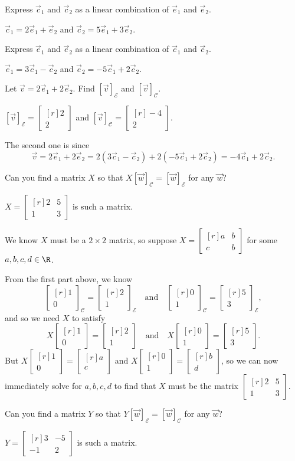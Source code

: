 \documentclass{problemset}
\newcommand{\xhat}{{\vec e_1}}
\newcommand{\yhat}{{\vec e_2}}
\newcommand{\mat}[1]{\begin{bmatrix*}[r]#1\end{bmatrix*}}
\begin{document}
	\begin{parts}
		\item Express $\vec c_1$ and $\vec c_2$ as a linear combination of $\xhat$ and $\yhat$.
			\begin{solution}[inline]
				$\vec c_1=2\xhat+\yhat$ and $\vec c_2=5\xhat+3\yhat$.
			\end{solution}
		\item Express $\xhat$ and $\yhat$ as a linear combination of $\vec c_1$ and $\vec c_2$.
			\begin{solution}[inline]
				$\xhat=3\vec c_1-\vec c_2$ and $\yhat=-5\vec c_1+2\vec c_2$.
			\end{solution}
		\item Let $\vec v=2\xhat+2\yhat$. Find $[\vec v]_{\mathcal E}$ and $[\vec v]_{\mathcal C}$.
			\begin{solution}
				$[\vec v]_{\mathcal E} = \mat{2\\2}$ and
				$[\vec v]_{\mathcal C} = \mat{-4\\2}$.

				The second one is since
				\[
					\vec v=2\xhat+2\yhat
					=2(3\vec c_1-\vec c_2)+2(-5\vec c_1+2\vec c_2)
					=-4\vec c_1+2\vec c_2.
				\]
			\end{solution}
		\item Can you find a matrix $X$ so that $X[\vec w]_{\mathcal C} = [\vec w]_{\mathcal E}$
			for any	$\vec w$?
			\begin{solution}
				$X = \mat{2&5\\1&3}$ is such a matrix.

				We know $X$ must be a $2\times2$ matrix, so suppose $X=\mat{a&b\\c&b}$
				for some $a,b,c,d\in\R$.

				From the first part above, we know
				\[
					\mat{1\\0}_{\mathcal C} = \mat{2\\1}_{\mathcal E}
					\quad \text{and} \quad
					\mat{0\\1}_{\mathcal C} = \mat{5\\3}_{\mathcal E},
				\]
				and so we need $X$ to satisfy
				\[
					X\mat{1\\0}=\mat{2\\1}
					\quad \text{and} \quad
					X\mat{0\\1}=\mat{5\\3}.
				\]
				But $X\mat{1\\0}=\mat{a\\c}$ and $X\mat{0\\1}=\mat{b\\d}$, so we
				can now immediately solve for $a,b,c,d$ to find that $X$ must be
				the matrix $\mat{2&5\\1&3}$.
			\end{solution}
		\item Can you find a matrix $Y$ so that $Y[\vec w]_{\mathcal E} = [\vec w]_{\mathcal C}$
			for any	$\vec w$?
			\begin{solution}
				$Y = \mat{3&-5\\-1&2}$ is such a matrix.


\end{solution}
\end{parts}
\end{document}
